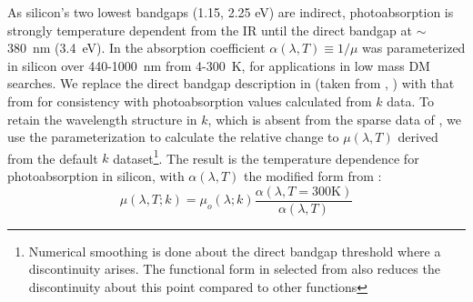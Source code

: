 As silicon's two lowest bandgaps (1.15, 2.25 eV) are indirect, photoabsorption is strongly temperature dependent from the IR until the direct bandgap at $\sim$ 380~nm (3.4~eV). In \cite{siBandgap_dmPaper} the absorption coefficient $\alpha(\lambda, T) \equiv 1/\mu$ was parameterized in silicon over 440-1000~nm from 4-300~K, for applications in low mass DM searches. We replace the direct bandgap description in \cite{siBandgap_dmPaper} (taken from \cite{siBandgap_solarCells}, \cite{siBandgap_cardona_1985}) with that from \cite{siAbsorption_Bucher} for consistency with photoabsorption values calculated from $k$ data.
To retain the wavelength structure in $k$, which is absent from the sparse data of \cite{siBandgap_dmPaper}, we use the parameterization to calculate the relative change to $\mu(\lambda, T)$ derived from the default $k$ dataset\footnote{Numerical smoothing is done about the direct bandgap threshold where a discontinuity arises. The functional form in selected from \cite{siAbsorption_Bucher} also reduces the discontinuity about this point compared to other functions}. The result is the temperature dependence for photoabsorption in silicon, with $\alpha(\lambda, T)$ the modified form from \cite{siBandgap_dmPaper}:
\begin{equation}
    \mu(\lambda, T; k) = \mu_o(\lambda; k) \frac{\alpha(\lambda, T=300\text{K})}{\alpha(\lambda, T)}
    \label{eq:alpha_relative}
\end{equation}